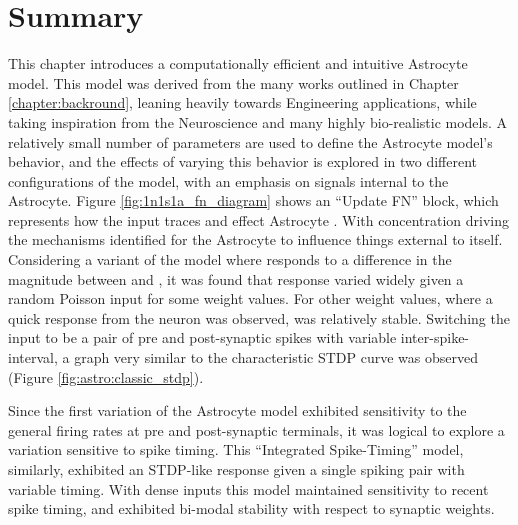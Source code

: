 \section{Summary}
This chapter introduces a computationally efficient and intuitive Astrocyte
model. This model was derived from the many works outlined in Chapter
\ref{chapter:backround}, leaning heavily towards Engineering applications,
while taking inspiration from the Neuroscience and many highly bio-realistic
models. A relatively small number of parameters are used to define the
Astrocyte model's behavior, and the effects of varying this behavior is
explored in two different configurations of the model, with an emphasis on
signals internal to the Astrocyte. Figure \ref{fig:1n1s1a_fn_diagram} shows
an ``Update FN'' block, which represents how the input traces \ipt and \kp
effect Astrocyte \ca. With \ca concentration driving the mechanisms
identified for the Astrocyte to influence things external to
itself. Considering a variant of the model where \ca responds to a
difference in the magnitude between \ipt and \kp, it was found that \ca
response varied widely given a random Poisson input for some weight values.
For other weight values, where a quick response from the neuron was
observed, \ca was relatively stable. Switching the input to be a pair
of pre and post-synaptic spikes with variable inter-spike-interval, a graph
very similar to the characteristic STDP curve was observed (Figure
\ref{fig:astro:classic_stdp}).

Since the first variation of the Astrocyte model exhibited sensitivity to
the general firing rates at pre and post-synaptic terminals, it was logical
to explore a variation sensitive to spike timing. This ``Integrated Spike-Timing''
model, similarly, exhibited an STDP-like \ca response given a single spiking
pair with variable timing. With dense inputs this model maintained sensitivity
to recent spike timing, and exhibited bi-modal stability with respect to
synaptic weights.
